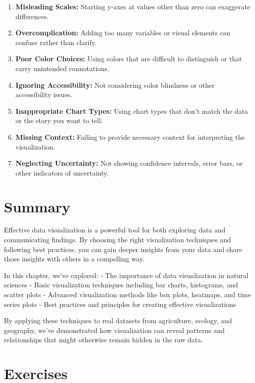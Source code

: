 \documentclass[
  letterpaper,
]{book}
\begin{document}
\begin{enumerate}
\def\labelenumi{\arabic{enumi}.}
\item
  \textbf{Misleading Scales:} Starting y-axes at values other than zero
  can exaggerate differences.
\item
  \textbf{Overcomplication:} Adding too many variables or visual
  elements can confuse rather than clarify.
\item
  \textbf{Poor Color Choices:} Using colors that are difficult to
  distinguish or that carry unintended connotations.
\item
  \textbf{Ignoring Accessibility:} Not considering color blindness or
  other accessibility issues.
\item
  \textbf{Inappropriate Chart Types:} Using chart types that don't match
  the data or the story you want to tell.
\item
  \textbf{Missing Context:} Failing to provide necessary context for
  interpreting the visualization.
\item
  \textbf{Neglecting Uncertainty:} Not showing confidence intervals,
  error bars, or other indicators of uncertainty.
\end{enumerate}

\section{Summary}\label{summary-5}

Effective data visualization is a powerful tool for both exploring data
and communicating findings. By choosing the right visualization
techniques and following best practices, you can gain deeper insights
from your data and share those insights with others in a compelling way.

In this chapter, we've explored: - The importance of data visualization
in natural sciences - Basic visualization techniques including bar
charts, histograms, and scatter plots - Advanced visualization methods
like box plots, heatmaps, and time series plots - Best practices and
principles for creating effective visualizations

By applying these techniques to real datasets from agriculture, ecology,
and geography, we've demonstrated how visualization can reveal patterns
and relationships that might otherwise remain hidden in the raw data.

\section{Exercises}\label{exercises-5}
\end{document}
